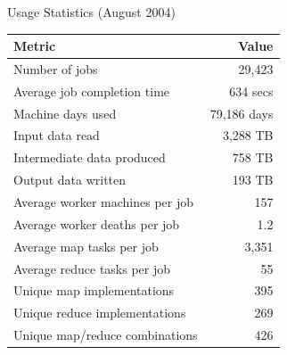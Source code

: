 \documentclass[aspectratio=169]{beamer}
\begin{document}
\begin{frame}{Usage Statistics (August 2004)}
\begin{table}
\centering
\small
\begin{tabular}{lr}
\toprule
\textbf{Metric} & \textbf{Value} \\
\midrule
Number of jobs & 29,423 \\
Average job completion time & 634 secs \\
Machine days used & 79,186 days \\
Input data read & 3,288 TB \\
Intermediate data produced & 758 TB \\
Output data written & 193 TB \\
Average worker machines per job & 157 \\
Average worker deaths per job & 1.2 \\
Average map tasks per job & 3,351 \\
Average reduce tasks per job & 55 \\
Unique map implementations & 395 \\
Unique reduce implementations & 269 \\
Unique map/reduce combinations & 426 \\
\bottomrule
\end{tabular}
\end{table}
\end{frame}
\end{document}
